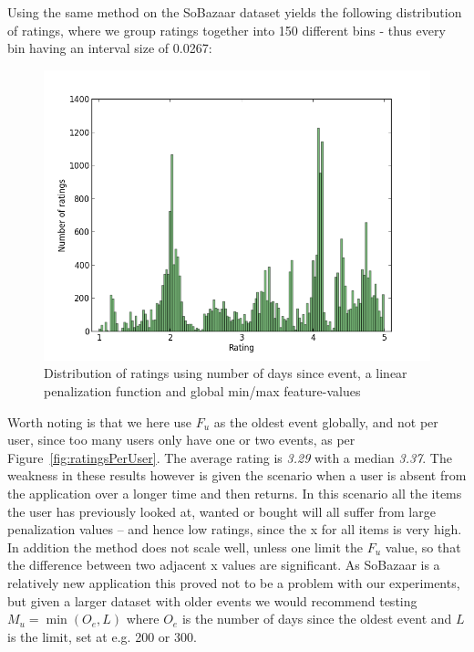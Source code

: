 Using the same method on the SoBazaar dataset yields the following distribution
of ratings, where we group ratings together into 150 different bins - thus
every bin having an interval size of 0.0267:

\begin{figure}[H]
  \centering
  \includegraphics[scale=0.6]{image/dist-recentness-linear-global}
 \caption[Distribution of ratings using number of days since event]{Distribution of ratings using number of days since event, a linear
 penalization function and global min/max feature-values}
  \label{fig:dist-recentness-linear-global}
\end{figure}

Worth noting is that we here use $F_u$ as the oldest event globally, and not
per user, since too many users only have one or two events, as per
Figure~\ref{fig:ratingsPerUser}. The average rating is \textit{3.29} with a
median \textit{3.37}. The weakness in these results however is given the
scenario when a user is absent from the application over a longer time and then
returns. In this scenario all the items the user has previously looked at,
wanted or bought will all suffer from large penalization values -- and hence low
ratings, since the x for all items is very high. In addition the method does
not scale well, unless one limit the $F_u$ value, so that the difference
between two adjacent x values are significant. As SoBazaar is a relatively new
application this proved not to be a problem with our experiments, but given a
larger dataset with older events we would recommend testing $M_u = \min(O_e,
L)$ where $O_e$ is the number of days since the oldest event and $L$ is the
limit, set at e.g. 200 or 300.

